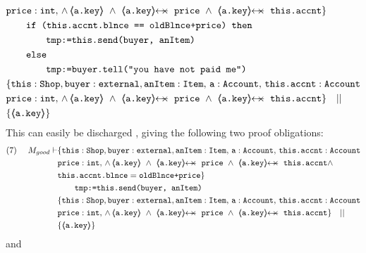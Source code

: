 \begin{proofO}
\begin{align*}
				& \prg{price} : \prg{int},\,
				  \wedge\, 
				  {\inside{\prg{a.key}}}\ \wedge\ 
				  \protectedFrom{\prg{a.key}}{\prg{price}}\ \wedge\ 
				   \protectedFrom{\prg{a.key}}{\prg{this.accnt}}\} \\
		  		&\SPT \prg{if (this.accnt.blnce == oldBlnce+price) then} \\
				 &\SPT \SPT \prg{tmp:=this.send(buyer, anItem)}\ \\  
				&\SPT  \prg{else} \\
				 &\SPT\SPT  \prg{tmp:=buyer.tell("you have not paid me")}\\
		  		& \{  \prg{this}:\prg{Shop}, \prg{buyer} : \prg{external}, \prg{anItem} : \prg{Item},\, \prg{a}:\prg{Account},\, \prg{this.accnt}:\prg{Account}\\
				& \prg{price} : \prg{int},\,
				  \wedge\, 
				  {\inside{\prg{a.key}}}\ \wedge\ 
				  \protectedFrom{\prg{a.key}}{\prg{price}}\ \wedge\ 
				   \protectedFrom{\prg{a.key}}{\prg{this.accnt}}\} \ \ \  || \ \ \ \\
		  		& \{ {\inside{\prg{a.key}}} \}
\end{align*}
\normalsize
This can easily be discharged \sdN{using   {\sc{If\_Rule}}}, giving the following two proof obligations:
\small
\begin{align*}
\text{(7)}  \ \ \ \ M_{good} \vdash & \{  \prg{this}:\prg{Shop}, \prg{buyer} : \prg{external}, \prg{anItem} : \prg{Item},\, \prg{a}:\prg{Account},\, \prg{this.accnt}:\prg{Account}\\
				& \prg{price} : \prg{int},\,
				  \wedge\, 
				  {\inside{\prg{a.key}}}\ \wedge\ 
				  \protectedFrom{\prg{a.key}}{\prg{price}}\ \wedge\ 
				   \protectedFrom{\prg{a.key}}{\prg{this.accnt}} \wedge \\
				&  \prg{this.accnt.blnce} = \prg{oldBlnce+price}\} \\
		  		&\SPT  \prg{tmp:=this.send(buyer, anItem)}\ \\  
		  		& \{  \prg{this}:\prg{Shop}, \prg{buyer} : \prg{external}, \prg{anItem} : \prg{Item},\, \prg{a}:\prg{Account},\, \prg{this.accnt}:\prg{Account}\\
				& \prg{price} : \prg{int},\,
				  \wedge\, 
				  {\inside{\prg{a.key}}}\ \wedge\ 
				  \protectedFrom{\prg{a.key}}{\prg{price}}\ \wedge\ 
				   \protectedFrom{\prg{a.key}}{\prg{this.accnt}}\} \ \ \  || \ \ \ \\
		  		& \{ {\inside{\prg{a.key}}} \}
\end{align*}
\normalsize
and 
\small
\begin{align*}

\end{align*}
\end{proofO}
